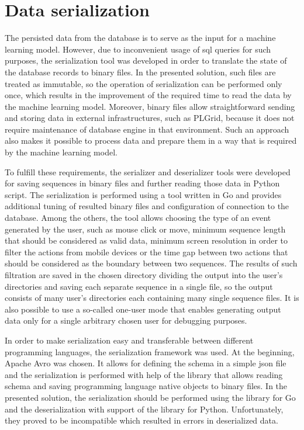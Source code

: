 \section{Data serialization}\label{sec:data-serialization}
The persisted data from the database is to serve as the input for a machine learning model.
However, due to inconvenient usage of \gls{sql} queries for such purposes, the serialization tool was developed in order to translate the state of the database records to binary files.
In the presented solution, such files are treated as immutable, so the operation of serialization can be performed only once, which results in the improvement of the required time to read the data by the machine learning model.
Moreover, binary files allow straightforward sending and storing data in external infrastructures, such as PLGrid, because it does not require maintenance of database engine in that environment.
Such an approach also makes it possible to process data and prepare them in a way that is required by the machine learning model.

To fulfill these requirements, the serializer and deserializer tools were developed for saving sequences in binary files and further reading those data in Python script.
The serialization is performed using a tool written in Go and provides additional tuning of resulted binary files and configuration of connection to the database.
Among the others, the tool allows choosing the type of an event generated by the user, such as mouse click or move, minimum sequence length that should be considered as valid data, minimum screen resolution in order to filter the actions from mobile devices or the time gap between two actions that should be considered as the boundary between two sequences.
The results of such filtration are saved in the chosen directory dividing the output into the user's directories and saving each separate sequence in a single file, so the output consists of many user's directories each containing many single sequence files.
It is also possible to use a so-called one-user mode that enables generating output data only for a single arbitrary chosen user for debugging purposes.

In order to make serialization easy and transferable between different programming languages, the serialization framework was used.
At the beginning, Apache Avro was chosen.
It allows for defining the schema in a simple \gls{json} file and the serialization is performed with help of the library that allows reading schema and saving programming language native objects to binary files.
In the presented solution, the serialization should be performed using the library for Go and the deserialization with support of the library for Python.
Unfortunately, they proved to be incompatible which resulted in errors in deserialized data.

